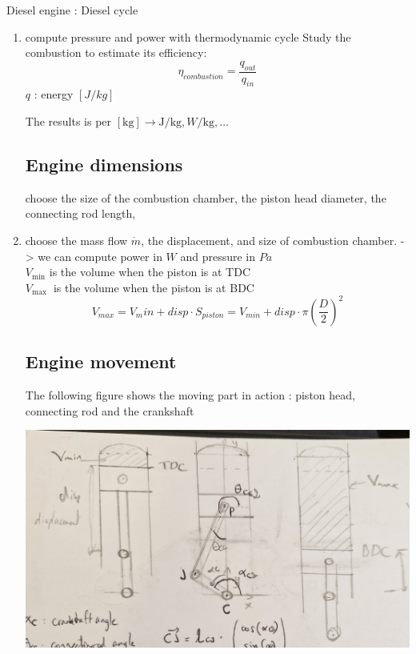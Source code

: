 \documentclass[12pt,a4paper]{article}
\begin{document}
	Diesel engine : Diesel cycle
	
	
	
	\begin{enumerate}
		\item compute pressure and power with thermodynamic cycle
	Study the combustion to estimate its efficiency:
	\begin{equation*}
		\eta_{combustion}=\frac{q_{out}}{q_{in}} \tag{1}
	\end{equation*}	
	$q$ : energy $[J / kg]$
	
	The results is per $[\mathrm{kg}] \rightarrow \mathrm{J} / \mathrm{kg}, W / \mathrm{kg}, \ldots$\\
	
	\subsection{Engine dimensions}
	choose the size of the combustion chamber, the piston head diameter, the connecting rod length, 
		\item choose the mass flow $\dot{m}$, the displacement, and size of combustion chamber. -> we can compute power in $W$ and pressure in $Pa$\\
	$V_{\min }$ is the volume when the piston is at TDC\\
	$V_{\text {max }}$ is the volume when the piston is at BDC\\
	
	\begin{equation}
		V_{max} = V_min + disp \cdot S_{piston} = V_{min} + disp \cdot \pi (\frac{D}{2})^2
	\end{equation}
	
	\subsection{Engine movement}
	The following figure shows the moving part in action : piston head, connecting rod and the crankshaft
	
	\includegraphics[scale=.2]{Engine_schema.jpg}
	

\end{enumerate}
\end{document}
